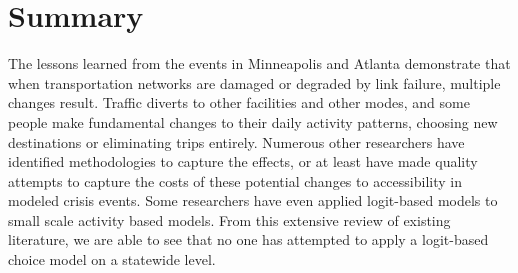 \section{Summary}

The lessons learned from the events in Minneapolis and Atlanta demonstrate
that when
transportation networks are damaged or degraded by link failure, multiple
changes result. Traffic
diverts to other facilities and other modes, and some people make
fundamental changes to their
daily activity patterns, choosing new destinations or eliminating trips
entirely. Numerous other
researchers have identified methodologies to capture the effects, or at
least have made quality attempts to capture the costs of these
potential changes to accessibility in modeled crisis events. Some researchers
have even applied logit-based models to small scale activity based models.
From this extensive review of existing literature, we are able to see that no
one has attempted to apply a logit-based choice model on a statewide level.
